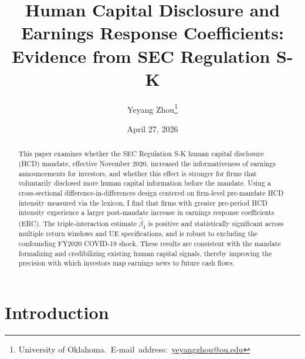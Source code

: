 \documentclass[12pt,english]{article}
\begin{document}
\begin{singlespace}
\title{Human Capital Disclosure and Earnings Response Coefficients:
       Evidence from SEC Regulation S-K}
\end{singlespace}

\author{Yeyang Zhou\thanks{University of Oklahoma.\
E-mail~address:~\href{mailto:yeyangzhou@ou.edu}{yeyangzhou@ou.edu}}}

\date{April 27, 2026}

\maketitle

\begin{abstract}
\begin{singlespace}
This paper examines whether the SEC Regulation S-K human capital disclosure
(HCD) mandate, effective November 2020, increased the informativeness of
earnings announcements for investors, and whether this effect is stronger for
firms that voluntarily disclosed more human capital information before the
mandate. Using a cross-sectional difference-in-differences design centered on
firm-level pre-mandate HCD intensity measured via the \citet{demers2024}
lexicon, I find that firms with greater pre-period HCD intensity experience a
larger post-mandate increase in earnings response coefficients (ERC). The
triple-interaction estimate $\hat{\beta}_4$ is positive and statistically
significant across multiple return windows and UE specifications, and is robust
to excluding the confounding FY2020 COVID-19 shock. These results are
consistent with the mandate formalizing and credibilizing existing human
capital signals, thereby improving the precision with which investors map
earnings news to future cash flows.
\end{singlespace}
\end{abstract}

\vfill{}
\pagebreak{}


\section{Introduction}\label{sec:intro}
\end{document}
